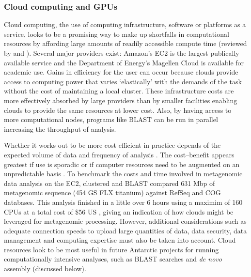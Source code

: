 \subsubsection{Cloud computing and \acs{GPU}s}
Cloud computing, the use of computing infrastructure, software or platforms as a service, looks to be a promising way to make up shortfalls in computational resources by affording large amounts of readily accessible compute time (reviewed by \citet{Schatz2010} and \citet{Thakur2012}).
Several major providers exist: Amazon's \ac{EC2} is the largest publically available service and the Department of Energy's Magellen Cloud is available for academic use.
Gains in efficiency for the user can occur because clouds provide access to computing power that varies `elastically' with the demands of the task without the cost of maintaining a local cluster.
These infrastructure costs are more effectively absorbed by large providers than by smaller facilities enabling clouds to provide the same resources at lower cost.
Also, by having access to more computational nodes, programs like \acs{BLAST} can be run in parallel increasing the throughput of analysis.

Whether it works out to be more cost efficient in practice depends of the expected volume of data and frequency of analysis \cite{Wilkening2009}.
The cost--benefit appears greatest if use is sporadic or if computer resources need to be augmented on an unpredictable basis \cite{Wilkening2009}.
To benchmark the costs and time involved in metagenomic data analysis on the \ac{EC2}, \citet{Angiuoli2011} clustered and \acs{BLAST} compared 631 Mbp of metagenomic sequence (454 GS FLX titanium) against RefSeq and \acs{COG} databases.
This analysis finished in a little over 6 hours using a maximim of 160 \acs{CPU}s at a total cost of \$56 US \cite{Angiuoli2011}, giving an indication of how clouds might be leveraged for metagenomic processing.
However, additional considerations such as adequate connection speeds to upload large quantities of data, data security, data management and computing expertise must also be taken into account.
Cloud resources look to be most useful in future Antarctic projects for running computationally intensive analyses, such as \acs{BLAST} searches and \emph{de novo} assembly (discussed below).


